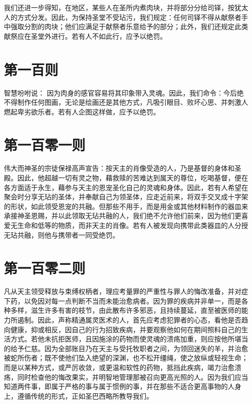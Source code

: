 我们还进一步得知，在地区，某些人在圣所内煮肉块，并将部分分给司铎，按犹太人的方式分发。因此，为保持圣堂不受玷污，我们规定：任何司铎不得从献祭者手中强取分割的肉块；他们应满足于献祭者乐意给予的部分；此外，我们还规定此类献祭应在圣堂外进行。若有人不如此行，应予以绝罚。\par


\section{第一百则}

智慧吩咐说： 因为肉身的感官容易将其印象带入灵魂。因此，我们命令：今后绝不得制作任何图画，无论是绘画还是其他方式，凡吸引眼目、败坏心思、并刺激人燃起卑劣欲乐者。若有人企图这样做，应予以绝罚。\par


\section{第一百零一则}

伟大而神圣的宗徒保禄高声宣告：按天主的肖像受造的人，乃是基督的身体和圣殿。因此，他超越一切有灵之物，藉救赎的苦难达到属天的尊位，吃喝基督，便在各方面适于永生，藉参与天主的恩宠圣化自己的灵魂和身体。因此，若有人希望在聚会时分享无玷的圣体，并奉献自己为领圣体，应走近前来，将双手交叉成十字架的形状，如此领受恩宠的共融。但那些不用手，而是用金或其他材料制作的器皿来承接神圣恩赐，并以此领取无玷共融的人，我们绝不允许他们前来，因为他们更喜爱无生命和低等的物质，而非天主的肖像。若有人被发现向携带此类器皿的人分授无玷共融，则他与携带者一同受绝罚。\par


\section{第一百零二则}

凡从天主领受释放与束缚权柄者，理应考量罪的严重性与罪人的悔改准备，并对症下药，以免因对每一点判断不当而未能治愈病者。因为罪的疾病并非单一，而是各种多样，滋生许多有害的枝节，由此散布许多邪恶，且持续蔓延，直至被医师的能力所遏制。因此，声称精通属灵医术的人，首先应考虑犯罪者的心态，看他是否趋向健康，抑或相反，因自己的行为招致疾病，并要观察他如何在期间照料自己的生活方式。若他未抗拒医师，且因施涂的药物而使灵魂的溃疡加重，则应按他所堪当的给予仁慈。因为全部账目乃在天主与受托牧职者之间，为领回迷失的羊，并治愈被蛇所伤者；既不使他们坠入绝望的深渊，也不松开缰绳，使之放纵或轻视生命；而是以某种方式，或严厉收敛，或更温和软性的药物，抵挡此疾病，竭力治愈溃疡，同时检查他的悔改果实，并明智地管理那被召向更高光照的人。因为我们应当知道两件事，即属于严格的事与属于惯例的事，并在那些不适合更高事物的人身上，遵循传统的形式，正如圣巴西略所教导我们。\par

